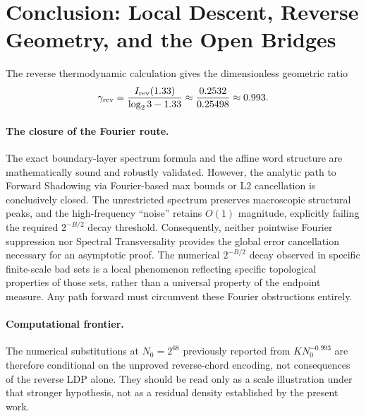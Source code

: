 \documentclass[12pt,a4paper]{article}
\begin{document}
\section{Conclusion: Local Descent, Reverse Geometry, and the Open Bridges}
\label{sec:conclusion}

The reverse thermodynamic calculation gives the dimensionless geometric ratio
\[
 \gamma_{\rm rev}
 =\frac{I_{\rm rev}(1.33)}{\log_2 3-1.33}
 \approx\frac{0.2532}{0.25498}\approx0.993.
\]
\paragraph{The closure of the Fourier route.}
The exact boundary-layer spectrum formula and the affine word structure are mathematically sound and robustly validated. However, the analytic path to Forward Shadowing via Fourier-based max bounds or L2 cancellation is conclusively closed. The unrestricted spectrum preserves macroscopic structural peaks, and the high-frequency ``noise'' retains $O(1)$ magnitude, explicitly failing the required $2^{-B/2}$ decay threshold. Consequently, neither pointwise Fourier suppression nor Spectral Transversality provides the global error cancellation necessary for an asymptotic proof. The numerical $2^{-B/2}$ decay observed in specific finite-scale bad sets is a local phenomenon reflecting specific topological properties of those sets, rather than a universal property of the endpoint measure. Any path forward must circumvent these Fourier obstructions entirely.

\paragraph{Computational frontier.}
The numerical substitutions at $N_0=2^{68}$ previously reported from
$K N_0^{-0.993}$ are therefore conditional on the unproved reverse-chord
encoding, not consequences of the reverse LDP alone.  They should be read only
as a scale illustration under that stronger hypothesis, not as a residual
density established by the present work.
\end{document}
